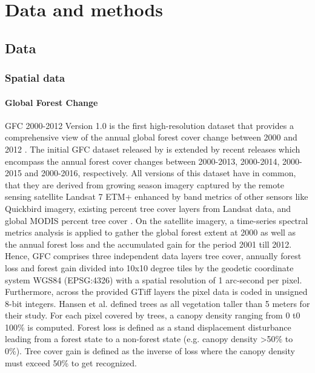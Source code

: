 \chapter{Data and methods}
\label{ch:datamethods}

\section{Data}
\label{sec:data}
	\subsection{Spatial data}
		\subsubsection{Global Forest Change}
			\ac{GFC} 2000-2012 Version 1.0 is the first high-resolution dataset that provides a comprehensive view of the annual global forest cover change between 2000 and 2012 \citep{Hansen2013, Li2017}. The initial \ac{GFC} dataset released by \citeauthor{Hansen2013} is extended by recent releases which encompass the annual forest cover changes between 2000-2013, 2000-2014, 2000-2015 and 2000-2016, respectively. All versions of this dataset have in common, that they are derived from growing season imagery captured by the remote sensing satellite Landsat 7 \ac{ETM+} enhanced by band metrics of other sensors like Quickbird imagery, existing percent tree cover layers from Landsat data, and global \ac{MODIS} percent tree cover \citep{Hansen2013}. On the satellite imagery, a time-series spectral metrics analysis is applied to gather the global forest extent at 2000 as well as the annual forest loss and the accumulated gain for the period 2001 till 2012. Hence, \ac{GFC} comprises three independent data layers tree cover, annually forest loss and forest gain divided into 10x10 degree tiles by the geodetic coordinate system \ac{WGS84} (EPSG:4326) with a spatial resolution of 1 arc-second per pixel. Furthermore, across the provided \ac{GTiff} layers the pixel data is coded in unsigned 8-bit integers. Hansen et al. defined trees as all vegetation taller than 5 meters for their study. For each pixel covered by trees, a canopy density ranging from 0 t0 100\% is computed. Forest loss is defined as a stand displacement disturbance leading from a forest state to a non-forest state (e.g. canopy density >50\% to 0\%). Tree cover gain is defined as the inverse of loss where the canopy density must exceed 50\% to get recognized.

